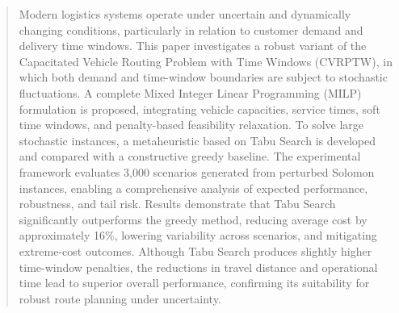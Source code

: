 %
\markboth{}{}
%
%








\maketitle
\thispagestyle{fancy}%
%


 
\begin{abstract}
Modern logistics systems operate under uncertain and dynamically changing conditions, particularly in relation to customer demand and delivery time windows. This paper investigates a robust variant of the Capacitated Vehicle Routing Problem with Time Windows (CVRPTW), in which both demand and time-window boundaries are subject to stochastic fluctuations. A complete Mixed Integer Linear Programming (MILP) formulation is proposed, integrating vehicle capacities, service times, soft time windows, and penalty-based feasibility relaxation. To solve large stochastic instances, a metaheuristic based on Tabu Search is developed and compared with a constructive greedy baseline. The experimental framework evaluates 3,000 scenarios generated from perturbed Solomon instances, enabling a comprehensive analysis of expected performance, robustness, and tail risk. Results demonstrate that Tabu Search significantly outperforms the greedy method, reducing average cost by approximately 16\%, lowering variability across scenarios, and mitigating extreme-cost outcomes. Although Tabu Search produces slightly higher time-window penalties, the reductions in travel distance and operational time lead to superior overall performance, confirming its suitability for robust route planning under uncertainty.
\end{abstract}


